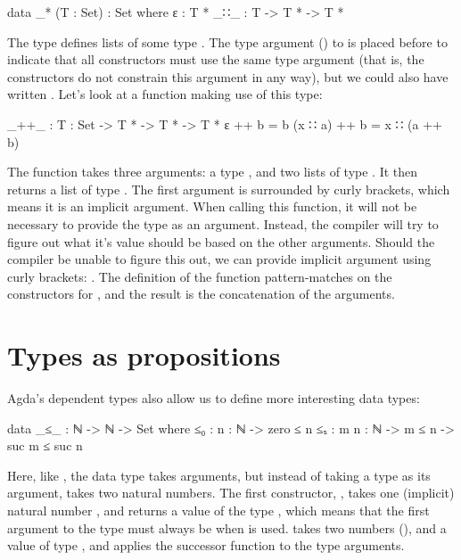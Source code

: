 		\begin{code}
			data _* (T : Set) : Set where
			  ε : T *
			  _∷_ : T -> T * -> T *
		\end{code}

		The type \codett{\_*} defines lists of some type . The type
		argument () to \codett{\_*} is placed before \codett{:}
		to indicate that all constructors must use the same type argument (that
		is, the constructors do not constrain this argument in any way), but we
		could also have written . Let's look
		at a function making use of this type:

		\begin{code}
			_++_ : {T : Set} -> T * -> T * -> T *
			ε ++ b = b
			(x ∷ a) ++ b = x ∷ (a ++ b)
		\end{code}

		The function \codett{\_++\_} takes three arguments: a type ,
		and two lists of type . It then returns a list of type
		. The first argument is surrounded by curly brackets, which
		means it is an implicit argument. When calling this function, it will
		not be necessary to provide the type as an argument. Instead, the
		compiler will try to figure out what it's value should be based on the
		other arguments. Should the compiler be unable to figure this out, we
		can provide implicit argument using curly brackets: . The definition of the function pattern-matches on the
		constructors for , and the result is the concatenation of
		the arguments.

%

	\section{Types as propositions}

		Agda's dependent types also allow us to define more interesting data
		types:

		\begin{code}
			data _≤_ : ℕ -> ℕ -> Set where
			  ≤₀ : {n : ℕ} -> zero ≤ n
			  ≤ₛ : {m n : ℕ} -> m ≤ n -> suc m ≤ suc n
		\end{code}

		Here, like \codett{\_*}, the data type  takes arguments,
		but instead of taking a type as its argument,  takes two
		natural numbers. The first constructor, , takes one
		(implicit) natural number , and returns a value of the type
		, which means that the first argument to the type must
		always be  when  is used.  takes two
		numbers (), and a value of type , and applies
		the successor function to the type arguments.

